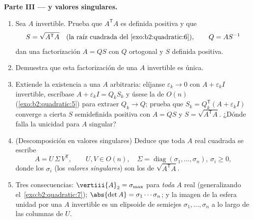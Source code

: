 \begin{problem}
\medskip
\noindent\textbf{Parte III ---  y valores
singulares.}
\begin{enumerate}[resume]
  \item Sea $A$ invertible. Prueba que $A^{\mathsf T}A$ es definida
        positiva y que
        \[
        S = \sqrt{A^{\mathsf T}A}
        \quad\text{(la raíz cuadrada del~\cref{exo:b2:quadratic:6})},
        \qquad Q = AS^{-1}
        \]
        dan una factorización $A = QS$ con $Q$ ortogonal y $S$
        definida positiva.
  \item Demuestra que esta factorización de una $A$ invertible es
        única.
  \item Extiende la existencia a una $A$ arbitraria: elíjanse
        $\varepsilon_k \to 0$ con $A + \varepsilon_k I$ invertible,
        escríbase $A + \varepsilon_kI = Q_kS_k$ y úsese la
         de $O(n)$ (\cref{exo:b2:quadratic:5}) para
        extraer $Q_k \to Q$; prueba que $S_k = Q_k^{\mathsf T}(A +
        \varepsilon_kI)$ converge a cierta $S$ semidefinida positiva
        con $A = QS$ y $S = \sqrt{A^{\mathsf T}A}$. ¿Dónde falla la
        unicidad para $A$ singular?
  \item (Descomposición en valores singulares) Deduce que toda $A$
        real cuadrada se escribe
        \[
        A = U\,\Sigma\,V^{\mathsf T},
        \qquad U, V \in O(n),\quad
        \Sigma = \operatorname{diag}(\sigma_1, \dots,
        \sigma_n),\ \sigma_i \geq 0 ,
        \]
        donde los $\sigma_i$ (los \emph{valores singulares}) son los
         de $\sqrt{A^{\mathsf T}A}$.
  \item Tres consecuencias: $\vertiii{A}_2 = \sigma_{\max}$ para
        \emph{toda} $A$ real (generalizando el~\cref{exo:b2:quadratic:7}); $\abs{\det A} =
        \sigma_1\cdots\sigma_n$; y la imagen de la esfera unidad por
        una $A$ invertible es un elipsoide de semiejes $\sigma_1,
        \dots, \sigma_n$ a lo largo de las columnas de $U$.
\end{enumerate}


\end{problem}
